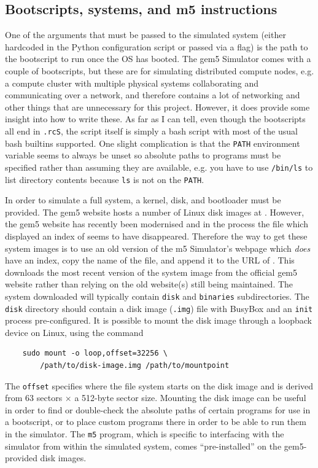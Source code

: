     \subsection{Bootscripts, systems, and m5 instructions}
    One of the arguments that must be passed to the simulated system (either 
    hardcoded in the Python configuration script or passed via a flag) is the 
    path to the bootscript to run once the OS has booted. The gem5 Simulator 
    comes with a couple of bootscripts, but these are for simulating distributed
    compute nodes, e.g. a compute cluster with multiple physical systems 
    collaborating and communicating over a network, and therefore contains a 
    lot of networking and other things that are unnecessary for this project. 
    However, it does provide some insight into how to write these. As far as I 
    can tell, even though the bootscripts all end in \texttt{.rcS}, the script 
    itself is simply a bash script with most of the usual bash builtins 
    supported. One slight complication is that the \texttt{PATH} environment 
    variable seems to always be unset so absolute paths to programs must be 
    specified rather than assuming they are available, e.g. you have to use 
    \texttt{/bin/ls} to list directory contents because \texttt{ls} is not on 
    the \texttt{PATH}.
    
    In order to simulate a full system, a kernel, disk, and bootloader must be
    provided. The gem5 website hosts a number of Linux disk images at
    \cite{noauthor_index_2020}. However, the gem5 website has recently been 
    modernised and in the process the file which displayed an index of 
    \cite{noauthor_index_2020} seems to have disappeared. Therefore the way to 
    get these system images is to use an old version of the m5 Simulator's 
    webpage \cite{noauthor_index_2017} which \textit{does} have an index, copy 
    the name of the file, and append it to the URL of 
    \cite{noauthor_index_2020}. This downloads the most recent version of the 
    system image from the official gem5 website rather than relying on the old 
    website(s) still being maintained. The system downloaded will typically 
    contain \texttt{disk} and \texttt{binaries} subdirectories. The 
    \texttt{disk} directory should contain a disk image (\texttt{.img}) file 
    with BusyBox \cite{noauthor_busybox_nodate} and an \texttt{init} process 
    pre-configured. It is possible to mount the disk image through a loopback 
    device on Linux, using the command
    \begin{lstlisting}
    sudo mount -o loop,offset=32256 \
        /path/to/disk-image.img /path/to/mountpoint
    \end{lstlisting}
    The \texttt{offset} specifies where the file system starts on the disk 
    image and is derived from 63 sectors $\times$ a 512-byte sector size. 
    Mounting the disk image can be useful in order to find or double-check the 
    absolute paths of certain programs for use in a bootscript, or to place 
    custom programs there in order to be able to run them in the simulator. The 
    \texttt{m5} program, which is specific to interfacing with the simulator 
    from within the simulated system, comes ``pre-installed'' on the 
    gem5-provided disk images.
    
